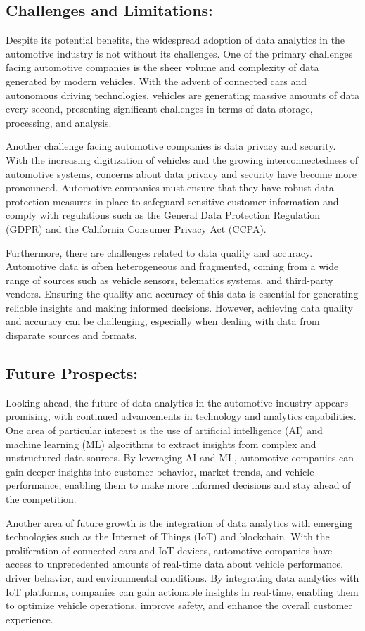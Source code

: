 \documentclass{article}
\begin{document}
{\subsection{Challenges and Limitations:}

Despite its potential benefits, the widespread adoption of data analytics in the automotive industry is not without its challenges. One of the primary challenges facing automotive companies is the sheer volume and complexity of data generated by modern vehicles. With the advent of connected cars and autonomous driving technologies, vehicles are generating massive amounts of data every second, presenting significant challenges in terms of data storage, processing, and analysis.

Another challenge facing automotive companies is data privacy and security. With the increasing digitization of vehicles and the growing interconnectedness of automotive systems, concerns about data privacy and security have become more pronounced. Automotive companies must ensure that they have robust data protection measures in place to safeguard sensitive customer information and comply with regulations such as the General Data Protection Regulation (GDPR) and the California Consumer Privacy Act (CCPA).

Furthermore, there are challenges related to data quality and accuracy. Automotive data is often heterogeneous and fragmented, coming from a wide range of sources such as vehicle sensors, telematics systems, and third-party vendors. Ensuring the quality and accuracy of this data is essential for generating reliable insights and making informed decisions. However, achieving data quality and accuracy can be challenging, especially when dealing with data from disparate sources and formats.

\subsection{Future Prospects:}

Looking ahead, the future of data analytics in the automotive industry appears promising, with continued advancements in technology and analytics capabilities. One area of particular interest is the use of artificial intelligence (AI) and machine learning (ML) algorithms to extract insights from complex and unstructured data sources. By leveraging AI and ML, automotive companies can gain deeper insights into customer behavior, market trends, and vehicle performance, enabling them to make more informed decisions and stay ahead of the competition.

Another area of future growth is the integration of data analytics with emerging technologies such as the Internet of Things (IoT) and blockchain. With the proliferation of connected cars and IoT devices, automotive companies have access to unprecedented amounts of real-time data about vehicle performance, driver behavior, and environmental conditions. By integrating data analytics with IoT platforms, companies can gain actionable insights in real-time, enabling them to optimize vehicle operations, improve safety, and enhance the overall customer experience.


}
\end{document}
